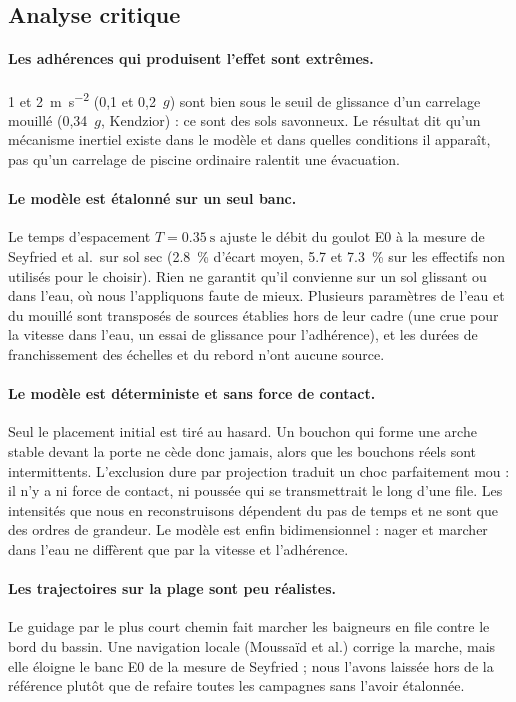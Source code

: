 \subsection{Analyse critique}

\paragraph{Les adhérences qui produisent l'effet sont extrêmes.} \num{1} et
\SI{2}{\metre\per\second\squared} (0,1 et 0,2~$g$) sont bien sous le seuil de glissance d'un
carrelage mouillé (0,34~$g$, Kendzior) : ce sont des sols savonneux. Le résultat dit qu'un
mécanisme inertiel existe dans le modèle et dans quelles conditions il apparaît, pas qu'un
carrelage de piscine ordinaire ralentit une évacuation.

\paragraph{Le modèle est étalonné sur un seul banc.} Le temps d'espacement
$T=\SI{0.35}{\second}$ ajuste le débit du goulot E0 à la mesure de Seyfried et al.\ sur sol
sec (\SI{2.8}{\percent} d'écart moyen, \num{5.7} et \SI{7.3}{\percent} sur les effectifs non
utilisés pour le choisir). Rien ne garantit qu'il convienne sur un sol glissant ou dans l'eau,
où nous l'appliquons faute de mieux. Plusieurs paramètres de l'eau et du mouillé sont
transposés de sources établies hors de leur cadre (une crue pour la vitesse dans l'eau, un
essai de glissance pour l'adhérence), et les durées de franchissement des échelles et du
rebord n'ont aucune source.

\paragraph{Le modèle est déterministe et sans force de contact.} Seul le placement initial est
tiré au hasard. Un bouchon qui forme une arche stable devant la porte ne cède donc jamais,
alors que les bouchons réels sont intermittents. L'exclusion dure par projection traduit un
choc parfaitement mou : il n'y a ni force de contact, ni poussée qui se transmettrait le long
d'une file. Les intensités que nous en reconstruisons dépendent du pas de temps et ne sont
que des ordres de grandeur. Le modèle est enfin bidimensionnel : nager et marcher dans l'eau
ne diffèrent que par la vitesse et l'adhérence.

\paragraph{Les trajectoires sur la plage sont peu réalistes.} Le guidage par le plus court
chemin fait marcher les baigneurs en file contre le bord du bassin. Une navigation locale
(Moussaïd et al.) corrige la marche, mais elle éloigne le banc E0 de la mesure de Seyfried ;
nous l'avons laissée hors de la référence plutôt que de refaire toutes les campagnes sans
l'avoir étalonnée.


